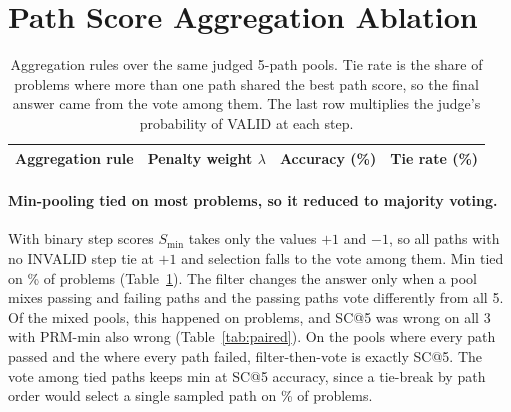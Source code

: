 \documentclass{article}
\begin{document}
\section{Path Score Aggregation Ablation}
\label{sec:ablation}

\begin{table}[t]
  \centering
  \small
  \caption{Aggregation rules over the same judged 5-path pools. Tie rate is the share of problems where more than one path shared the best path score, so the final answer came from the vote among them. The last row multiplies the judge's probability of VALID at each step.}
  \label{tab:ablation}
  \begin{tabular}{lccc}
    \toprule
    Aggregation rule & Penalty weight $\lambda$ & Accuracy (\%) & Tie rate (\%) \\
    \midrule
    
  \end{tabular}
\end{table}

\paragraph{Min-pooling tied on most problems, so it reduced to majority voting.} With binary step scores $S_{\min}$ takes only the values $+1$ and $-1$, so all paths with no INVALID step tie at $+1$ and selection falls to the vote among them. Min tied on \tieMin\% of problems (Table~\ref{tab:ablation}). The filter changes the answer only when a pool mixes passing and failing paths and the passing paths vote differently from all 5. Of the \mixedPools{} mixed pools, this happened on \minChangedAnswer{} problems, and SC@5 was wrong on all 3 with PRM-min also wrong (Table~\ref{tab:paired}). On the \allValidPools{} pools where every path passed and the \allInvalidPools{} where every path failed, filter-then-vote is exactly SC@5. The vote among tied paths keeps min at SC@5 accuracy, since a tie-break by path order would select a single sampled path on \tieMin\% of problems.
\end{document}
